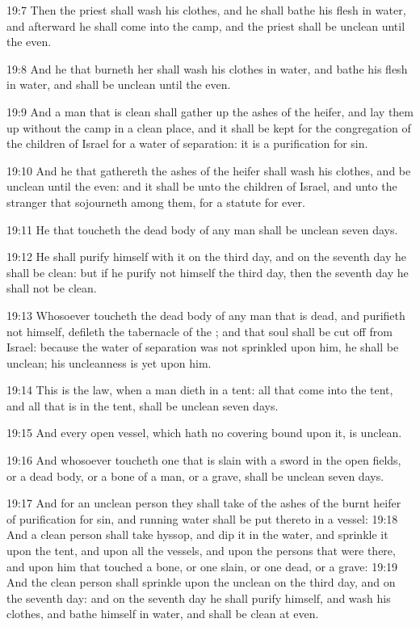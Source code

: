 19:7 Then the priest shall wash his clothes, and he shall bathe his
flesh in water, and afterward he shall come into the camp, and the
priest shall be unclean until the even.

19:8 And he that burneth her shall wash his clothes in water, and
bathe his flesh in water, and shall be unclean until the even.

19:9 And a man that is clean shall gather up the ashes of the heifer,
and lay them up without the camp in a clean place, and it shall be
kept for the congregation of the children of Israel for a water of
separation: it is a purification for sin.

19:10 And he that gathereth the ashes of the heifer shall wash his
clothes, and be unclean until the even: and it shall be unto the
children of Israel, and unto the stranger that sojourneth among them,
for a statute for ever.

19:11 He that toucheth the dead body of any man shall be unclean seven
days.

19:12 He shall purify himself with it on the third day, and on the
seventh day he shall be clean: but if he purify not himself the third
day, then the seventh day he shall not be clean.

19:13 Whosoever toucheth the dead body of any man that is dead, and
purifieth not himself, defileth the tabernacle of the \LORD; and that
soul shall be cut off from Israel: because the water of separation was
not sprinkled upon him, he shall be unclean; his uncleanness is yet
upon him.

19:14 This is the law, when a man dieth in a tent: all that come into
the tent, and all that is in the tent, shall be unclean seven days.

19:15 And every open vessel, which hath no covering bound upon it, is
unclean.

19:16 And whosoever toucheth one that is slain with a sword in the
open fields, or a dead body, or a bone of a man, or a grave, shall be
unclean seven days.

19:17 And for an unclean person they shall take of the ashes of the
burnt heifer of purification for sin, and running water shall be put
thereto in a vessel: 19:18 And a clean person shall take hyssop, and
dip it in the water, and sprinkle it upon the tent, and upon all the
vessels, and upon the persons that were there, and upon him that
touched a bone, or one slain, or one dead, or a grave: 19:19 And the
clean person shall sprinkle upon the unclean on the third day, and on
the seventh day: and on the seventh day he shall purify himself, and
wash his clothes, and bathe himself in water, and shall be clean at
even.

